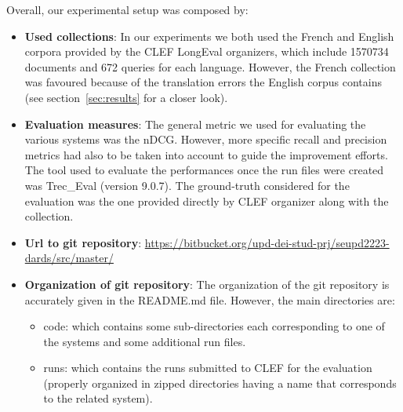 Overall, our experimental setup was composed by:
\begin{itemize}
	\item \textbf{Used collections}: In our experiments we both used the French and English corpora provided by the CLEF LongEval organizers, which include 1570734 documents and 672 queries for each language. However, the French collection was favoured because of the translation errors the English corpus contains (see section~\ref{sec:results} for a closer look).  
 
	\item \textbf{Evaluation measures}: The general metric we used for evaluating the various systems was the nDCG. However, more specific recall and precision metrics had also to be taken into account to guide the improvement efforts. The tool used to evaluate the performances once the run files were created was Trec\_Eval (version 9.0.7). The ground-truth considered for the evaluation was the one provided directly by CLEF organizer along with the collection.

 
	\item \textbf{Url to git repository}: \href{https://bitbucket.org/upd-dei-stud-prj/seupd2223-dards/src/master/}{https://bitbucket.org/upd-dei-stud-prj/seupd2223-dards/src/master/}



 
        \item \textbf{Organization of git repository}: The organization of the git repository is accurately given in the README.md file. However, the main directories are:
            \begin{itemize}
                \item code: which contains some sub-directories each corresponding to one of the systems and some additional run files.
                \item runs: which contains the runs submitted to CLEF for the evaluation (properly organized in zipped directories having a name that corresponds to the related system).
            \end{itemize}



\end{itemize}

